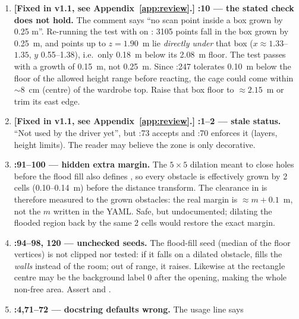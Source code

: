 \begin{review}
\begin{enumerate}[leftmargin=*]
\item \textcolor{OliveGreen}{\textbf{[Fixed in v1.1, see Appendix~\ref{app:review}.]}} \textbf{:10 --- the stated check does not hold.} The comment says ``no scan
  point inside a box grown by 0.25 m''. Re-running the test with  on
  : 3105 points fall in the  box grown by 0.25~m, and points up to
  $z = 1.90$~m lie \emph{directly under} that box ($x \approx 1.33$--$1.35$, $y$ 0.55--1.38), i.e.\ only 0.18~m
  below its 2.08~m floor. The test passes with a growth of 0.15~m, not 0.25~m. Since :247 tolerates
  0.10~m below the floor of the allowed height range before reacting, the cage could come within $\sim$8~cm (centre)
  of the wardrobe top. Raise that box floor to $\approx 2.15$~m or trim its east edge.
\item \textcolor{OliveGreen}{\textbf{[Fixed in v1.1, see Appendix~\ref{app:review}.]}} \textbf{:1--2 --- stale status.} ``Not used by the driver yet'', but
  :73 accepts  and :70 enforces it (layers, height
  limits). The reader may believe the zone is only decorative.
\item \textbf{:91--100 --- hidden extra margin.} The $5\times5$ dilation meant to close
  holes before the flood fill also defines , so every obstacle is effectively grown by 2 cells
  (0.10--0.14~m) before the distance transform. The clearance in  is therefore measured to the grown
  obstacles: the real margin is $\approx m + 0.1$~m, not the $m$ written in the YAML. Safe, but undocumented;
  dilating the flooded region back by the same 2 cells would restore the exact margin.
\item \textbf{:94--98, 120 --- unchecked seeds.} The flood-fill seed (median of the
  floor vertices) is not clipped nor tested: if it falls on a dilated obstacle,  fills the
  \emph{walls} instead of the room; out of range, it raises. Likewise  at the rectangle centre may be
  the background label 0 after the opening, making  the whole non-free area. Assert
   and .
\item \textbf{:4,71--72 --- docstring defaults wrong.} The usage line says

\end{enumerate}
\end{review}
